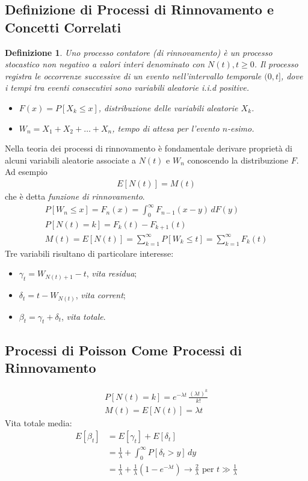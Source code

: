 \documentclass{article}
\newtheorem{definizione}{Definizione}[section]
\begin{document}
\subsection{Definizione di Processi di Rinnovamento e Concetti Correlati}
\begin{definizione}
Uno processo contatore (di rinnovamento) è un processo stocastico non negativo a valori interi denominato con $N(t), t \ge 0$. Il processo registra le occorrenze successive di un evento nell'intervallo temporale $(0,t]$, dove i tempi tra eventi consecutivi sono variabili aleatorie i.i.d positive.
\begin{itemize}
    \item $F(x) = P[X_k \le x]$, distribuzione delle variabili aleatorie $X_k$.
    \item $W_n = X_1+X_2+\hdots+X_n$, tempo di attesa per l'evento $n$-esimo.
\end{itemize}
\end{definizione}
Nella teoria dei processi di rinnovamento è fondamentale derivare proprietà di alcuni variabili aleatorie associate a $N(t)$ e $W_n$ conoscendo la distribuzione $F$. Ad esempio
\begin{align*}
E[N(t)] = M(t)
\end{align*}
che è detta \emph{funzione di rinnovamento}.
\begin{align*}
P[W_n \le x] = F_n(x) = \int_0^{\infty} F_{n-1}(x-y)\,dF(y)\\
P[N(t) = k] = F_k(t) - F_{k+1}(t)\\
M(t) = E[N(t)] = \sum_{k=1}^{\infty}P[W_k \le t]=\sum_{k=1}^{\infty}F_k(t)
\end{align*}
Tre variabili risultano di particolare interesse:
\begin{itemize}
    \item $\gamma_t = W_{N(t) + 1}-t$, \emph{vita residua};
    \item $\delta_t = t - W_{N(t)}$, \emph{vita corrent};
    \item $\beta_t = \gamma_t + \delta_t$, \emph{vita totale}.
\end{itemize}

\subsection{Processi di Poisson Come Processi di Rinnovamento}

\begin{gather*}
P[N(t) = k] = e^{-\lambda t}\,\frac{(\lambda t)^k}{k!}\\
M(t) = E[N(t)] = \lambda t
\end{gather*}
Vita totale media:
\begin{align*}
E[\beta_t] &= E[\gamma_t] + E[\delta_t]\\
&= \frac{1}{\lambda} + \int_0^{\infty}P[\delta_t > y]\,dy\\
&= \frac{1}{\lambda} + \frac{1}{\lambda}(1-e^{-\lambda t}) \to \frac{2}{\lambda} \text{ per } t \gg \frac{1}{\lambda}
\end{align*}
\end{document}
